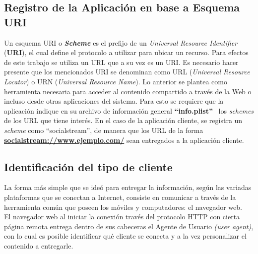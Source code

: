 	\subsection{Registro de la Aplicación en base a Esquema URI}
	Un esquema URI o \textbf{\textit{Scheme}} es el prefijo de un \textit{Universal Resource Identifier} (\textbf{URI}), el cual define el protocolo a utilizar para ubicar un recurso. Para efectos de este trabajo se utiliza un URL que a su vez es un URI. Es necesario hacer presente que los mencionados URI se denominan como URL (\textit{Universal Resource Locator}) o URN (\textit{Universal Resource Name}). Lo anterior se plantea como herramienta necesaria para acceder al contenido compartido a través de la Web o incluso desde otras aplicaciones del sistema. Para esto se requiere que la aplicación indique en su archivo de información general \textbf{\textquotedblleft info.plist\textquotedblright}  \ los \textit{schemes} de los URL que tiene interés.
En el caso de la aplicación cliente, se registra un \textit{scheme} como \textquotedblleft socialstream\textquotedblright , de manera que los URL de la forma \textbf{\url{socialstream://www.ejemplo.com/}} sean entregados a la aplicación cliente.


	\subsection{Identificación del tipo de cliente}
La forma más simple que se ideó para entregar la información, según las variadas plataformas que se conectan a Internet, consiste en comunicar a través de la herramienta común que poseen los móviles y computadores: el navegador web.\\

El navegador web al iniciar la conexión través del protocolo HTTP con cierta página remota entrega dentro de sus cabeceras el Agente de Usuario \textit{(user agent)}, con lo cual es posible identificar qué cliente se conecta y a la vez personalizar el contenido a entregarle.

